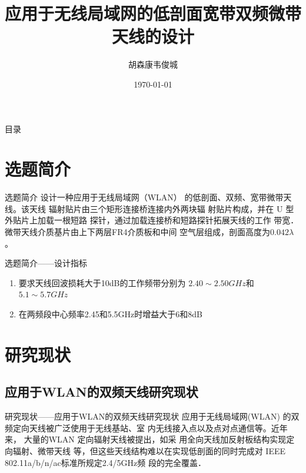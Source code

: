 \documentclass[10pt]{beamer}
\title{应用于无线局域网的低剖面宽带双频微带天线的设计}
\author{胡森康\inst{}韦俊城}
\institute[BIT]{Beijing Institute of Technology}
\date{\today}
\begin{document}
\begin{frame}
  \titlepage
\end{frame}


\begin{frame}{目录}
  \tableofcontents
\end{frame}

\section{选题简介}
\begin{frame}{选题简介}
	\qquad 设计一种应用于无线局域网（WLAN）
	的{\Large 低剖面、双频、宽带}微带天线。该天线
	辐射贴片由三个矩形连接桥连接内外两块辐
	射贴片构成，并在 U 型外贴片上加载一根短路
	探针，通过加载连接桥和短路探针拓展天线的工作
	带宽． 微带天线介质基片由上下两层FR4介质板和中间
	空气层组成，剖面高度为$0.042\lambda$。 
\end{frame}

\begin{frame}{选题简介——设计指标}


\begin{enumerate}
	\item 要求天线回波损耗大于10dB的工作频带分别为
	{\large $2.40\sim 2.50GHz$和$5.1\sim 5.7GHz$}\pause
	\item 在两频段中心频率2.45和5.5GHz时增益大于\large {6和8dB}
\end{enumerate}
\end{frame}

\section{研究现状}
\subsection*{应用于WLAN的双频天线研究现状}
\begin{frame}{研究现状——{\normalsize 应用于WLAN的双频天线研究现状}}
	\qquad 应用于无线局域网(WLAN) 
	的双频定向天线被广泛使用于无线基站、室
	内无线接入点以及点对点通信等。近年来，
	大量的WLAN 定向辐射天线被提出，如采
	用全向天线加反射板结构实现定向辐射、微带天线
	等，但这些天线结构难以在实现低剖面的同时完成对
	IEEE 802.11a/b/n/ac标准所规定2.4/5GHz频
	段的完全覆盖．
\end{frame}
\end{document}
